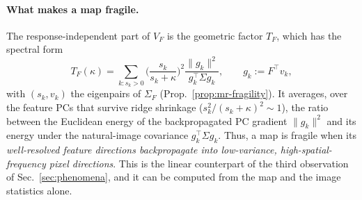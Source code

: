 \paragraph{What makes a map fragile.}
The response-independent part of $V_F$ is the geometric factor $T_F$, which has the spectral form
\begin{equation}
T_F(\kappa)=\sum_{k:s_k>0}\Big(\frac{s_k}{s_k+\kappa}\Big)^2\frac{\|g_k\|^2}{g_k^\top\Sigma g_k},
\qquad g_k:=F^\top v_k,
\label{eq:TF}
\end{equation}
with $(s_k,v_k)$ the eigenpairs of $\Sigma_F$ (Prop.~\ref{prop:mr-fragility}). It averages, over the feature PCs that survive ridge shrinkage ($s_k^2/(s_k+\kappa)^2\sim1$), the ratio between the Euclidean energy of the backpropagated PC gradient $\|g_k\|^2$ and its energy under the natural-image covariance $g_k^\top\Sigma g_k$. Thus, a map is fragile when its \textit{well-resolved feature directions backpropagate into low-variance, high-spatial-frequency pixel directions}. This is the linear counterpart of the third observation of Sec.~\ref{sec:phenomena}, and it can be computed from the map and the image statistics alone.

